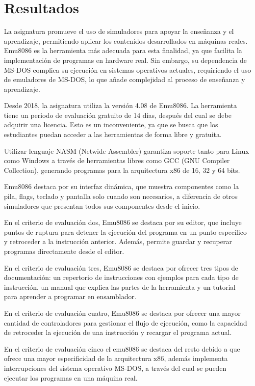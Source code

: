 \documentclass[12pt,oneside]{templates/unerthesis}
\begin{document}
\hypertarget{resultados}{%
\section{Resultados}\label{resultados}}

La asignatura promueve el uso de simuladores para apoyar la enseñanza y el aprendizaje, permitiendo aplicar los contenidos desarrollados en máquinas reales. Emu8086 es la herramienta más adecuada para esta finalidad, ya que facilita la implementación de programas en hardware real. Sin embargo, su dependencia de MS-DOS complica su ejecución en sistemas operativos actuales, requiriendo el uso de emuladores de MS-DOS, lo que añade complejidad al proceso de enseñanza y aprendizaje.

Desde 2018, la asignatura utiliza la versión 4.08 de Emu8086. La herramienta tiene un periodo de evaluación gratuito de 14 días, después del cual se debe adquirir una licencia. Esto es un inconveniente, ya que se busca que los estudiantes puedan acceder a las herramientas de forma libre y gratuita.

Utilizar lenguaje NASM (Netwide Assembler) garantiza soporte tanto para Linux como Windows a través de herramientas libres como GCC (GNU Compiler Collection), generando programas para la arquitectura x86 de 16, 32 y 64 bits.

Emu8086 destaca por su interfaz dinámica, que muestra componentes como la pila, flags, teclado y pantalla solo cuando son necesarios, a diferencia de otros simuladores que presentan todos sus componentes desde el inicio.

En el criterio de evaluación dos, Emu8086 se destaca por su editor, que incluye puntos de ruptura para detener la ejecución del programa en un punto específico y retroceder a la instrucción anterior. Además, permite guardar y recuperar programas directamente desde el editor.

En el criterio de evaluación tres, Emu8086 se destaca por ofrecer tres tipos de documentación: un repertorio de instrucciones con ejemplos para cada tipo de instrucción, un manual que explica las partes de la herramienta y un tutorial para aprender a programar en ensamblador.

En el criterio de evaluación cuatro, Emu8086 se destaca por ofrecer una mayor cantidad de controladores para gestionar el flujo de ejecución, como la capacidad de retroceder la ejecución de una instrucción y recargar el programa actual.

En el criterio de evaluación cinco el emu8086 se destaca del resto debido a que ofrece una mayor especificidad de la arquitectura x86, además implementa interrupciones del sistema operativo MS-DOS, a través del cual se pueden ejecutar los programas en una máquina real.
\end{document}
